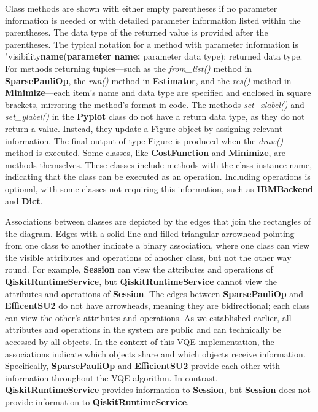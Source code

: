 \documentclass{article}
\begin{document}
Class methods are shown with either empty parentheses if no parameter information is needed or with detailed parameter information listed within the parentheses. The data type of the returned value is provided after the parentheses. The typical notation for a method with parameter information is "visibility\textbf{name}(\textbf{parameter name:} parameter data type): returned data type. For methods returning tuples—such as the \textit{from\_list()} method in \textbf{SparsePauliOp}, the \textit{run()} method in \textbf{Estimator}, and the \textit{res()} method in \textbf{Minimize}—each item's name and data type are specified and enclosed in square brackets, mirroring the method's format in code. 
The methods \textit{set\_xlabel()} and \textit{set\_ylabel()} in the \textbf{Pyplot} class do not have a return data type, as they do not return a value\cite{xlabel}\cite{ylabel}. Instead, they update a Figure object by assigning relevant information. The final output of type Figure is produced when the \textit{draw()} method is executed. 
Some classes, like \textbf{CostFunction} and \textbf{Minimize}, are methods themselves. These classes include methods with the class instance name, indicating that the class can be executed as an operation. Including operations is optional, with some classes not requiring this information, such as \textbf{IBMBackend} and \textbf{Dict}. 

Associations between classes are depicted by the edges that join the rectangles of the diagram. Edges with a solid line and filled triangular arrowhead pointing from one class to another indicate a binary association, where one class can view the visible attributes and operations of another class, but not the other way round\cite{Seidl_Scholz_Huemer_Kappel_Duffy_2014}. For example, \textbf{Session} can view the attributes and operations of \textbf{QiskitRuntimeService}, but \textbf{QiskitRuntimeService} cannot view the attributes and operations of \textbf{Session}. The edges between \textbf{SparsePauliOp} and \textbf{EfficentSU2} do not have arrowheads, meaning they are bidirectional; each class can view the other's attributes and operations\cite{Seidl_Scholz_Huemer_Kappel_Duffy_2014}. As we established earlier, all attributes and operations in the system are public and can technically be accessed by all objects. In the context of this VQE implementation, the associations indicate which objects share and which objects receive information. Specifically, \textbf{SparsePauliOp} and \textbf{EfficientSU2} provide each other with information throughout the VQE algorithm. In contrast, \textbf{QiskitRuntimeService} provides information to \textbf{Session}, but \textbf{Session} does not provide information to \textbf{QiskitRuntimeService}.
\end{document}
